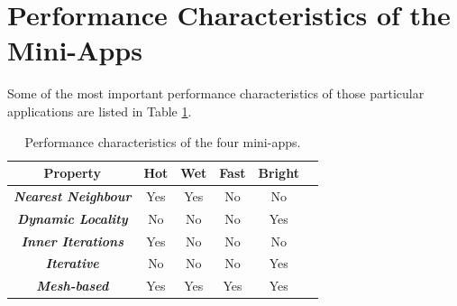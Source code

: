 \documentclass[runningheads,a4paper]{llncs}
\begin{document}
%
%
%
%


\section{Performance Characteristics of the Mini-Apps}

Some of the most important performance characteristics of those particular applications are listed in Table \ref{tab:perf-char-mini-apps}.

\begin{table}[h]
  \begin{center}
    \begin{tabular}{cccccc}
      \hline
      \textbf{Property} & \textbf{Hot} & \textbf{Wet} & \textbf{Fast} & \textbf{Bright} \\
      \hline
      \textit{\textbf{Nearest Neighbour}} & Yes & Yes & No & No \\
      \textit{\textbf{Dynamic Locality}} & No & No & No & Yes \\
      \textit{\textbf{Inner Iterations}} & Yes & No & No & No \\
      \textit{\textbf{Iterative}} & No & No & No & Yes \\
      \textit{\textbf{Mesh-based}} & Yes & Yes & Yes & Yes \\
    \end{tabular}
  \end{center}
  \caption{Performance characteristics of the four mini-apps.}
  \label{tab:perf-char-mini-apps}
\end{table}
\end{document}
